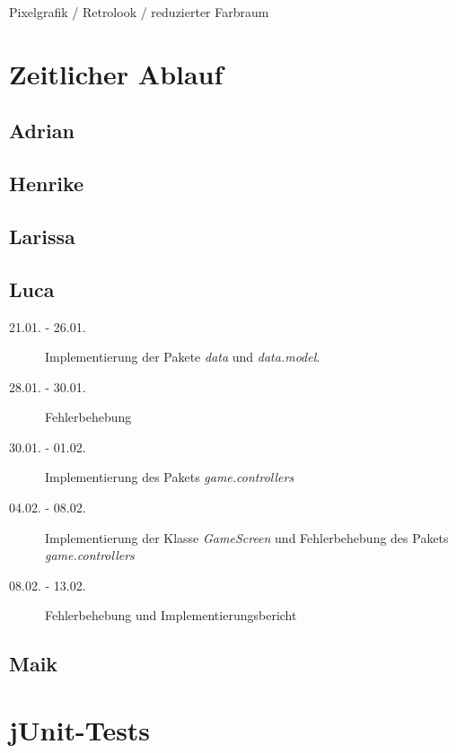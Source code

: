\documentclass[parskip=full]{scrreprt}
\begin{document}
\begin{description}
	\item Pixelgrafik / Retrolook / reduzierter Farbraum
\end{description}

\chapter{Zeitlicher Ablauf}

\section{Adrian}

\begin{description}
	\item[]
\end{description}

\section{Henrike}

\section{Larissa}

\section{Luca}

\begin{description}
\item[21.01. - 26.01.]
Implementierung der Pakete \emph{data} und \emph{data.model}.
\item[28.01. - 30.01.]
Fehlerbehebung
\item[30.01. - 01.02.]
Implementierung des Pakets \emph{game.controllers}
\item[04.02. - 08.02.]
Implementierung der Klasse \emph{GameScreen} und Fehlerbehebung des Pakets \emph{game.controllers}
\item[08.02. - 13.02.]
Fehlerbehebung und Implementierungsbericht
\end{description}

\section{Maik}

\chapter{jUnit-Tests}
\end{document}
